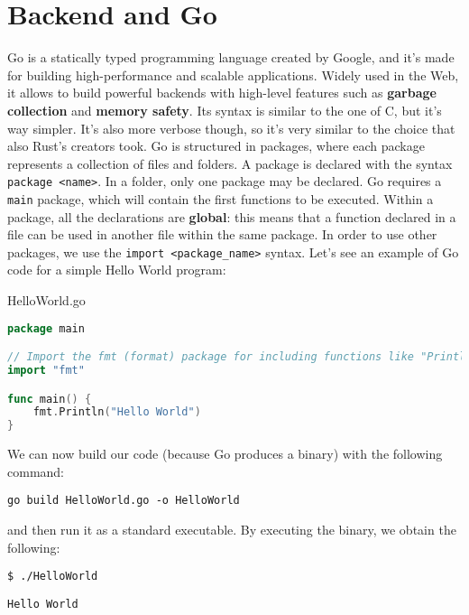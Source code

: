 \chapter{Backend and Go}

Go is a statically typed programming language created by Google, and it's made for building high-performance and scalable applications. Widely used in the Web, it allows to build powerful backends with high-level features such as \textbf{garbage collection} and \textbf{memory safety}. Its syntax is similar to the one of C, but it's way simpler. It's also more verbose though, so it's very similar to the choice that also Rust's creators took.
\nl
Go is structured in packages, where each package represents a collection of files and folders. A package is declared with the syntax \verb|package <name>|. In a folder, only one package may be declared. Go requires a \verb|main| package, which will contain the first functions to be executed.
\nl
Within a package, all the declarations are \textbf{global}: this means that a function declared in a file can be used in another file within the same package. In order to use other packages, we use the \verb|import <package_name>| syntax. Let's see an example of Go code for a simple Hello World program:

\begin{codeblock}{HelloWorld.go}
    \begin{lstlisting}[language = go]
package main

// Import the fmt (format) package for including functions like "Println()"
import "fmt"

func main() {
    fmt.Println("Hello World")
}\end{lstlisting}
\end{codeblock}

We can now build our code (because Go produces a binary) with the following command:

\begin{terminal}
    \begin{lstlisting}[style = notexterm]
go build HelloWorld.go -o HelloWorld
    \end{lstlisting}
\end{terminal}

and then run it as a standard executable. By executing the binary, we obtain the following:

\begin{terminal}
    \begin{lstlisting}[style = notexterm]
 $ ./HelloWorld
    \end{lstlisting}
    \begin{tcolorbox}
        \begin{lstlisting}[basewidth=0.44em, numbers=none]
Hello World\end{lstlisting}
    \end{tcolorbox}
\end{terminal}

